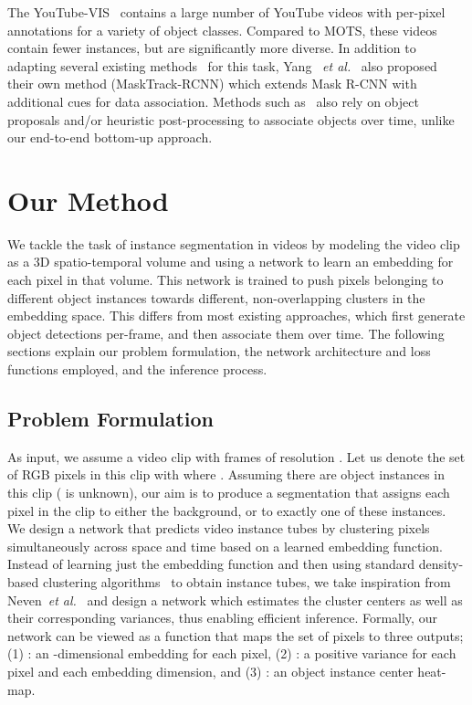 \documentclass[runningheads]{llncs}
\makeatletter
\newcommand*{\etal}{\emph{et al.}\@\xspace}
\makeatother
\begin{document}
The YouTube-VIS~\cite{Yang19ICCV} contains a large number of YouTube videos with per-pixel annotations for a variety of object classes. Compared to MOTS, these videos contain fewer instances, but are significantly more diverse. 
In addition to adapting several existing methods~\cite{Bochinski17AVSS,Han16arxiv,Voigtlaender19CVPRFeelVOS,Wojke17ICIP,Yang18CVPR} for this task, Yang ~\etal~\cite{Yang19ICCV} also proposed their own method (MaskTrack-RCNN) which extends Mask R-CNN with additional cues for data association. 
Methods such as~\cite{Dong19ICCVW,Feng19ICCVW,Liu19ICCVW} also rely on object proposals and/or heuristic post-processing to associate objects over time, unlike our end-to-end bottom-up approach. 
\section{Our Method}

We tackle the task of instance segmentation in videos by modeling the video clip as a 3D spatio-temporal volume and using a network to learn an embedding for each pixel in that volume. This network is trained to push pixels belonging to different object instances towards different, non-overlapping clusters in the embedding space. 
This differs from most existing approaches, which first generate object detections per-frame, and then associate them over time. The following sections explain our problem formulation, the network architecture and loss functions employed, and the inference process.

\subsection{Problem Formulation}
\label{sec:problem_formulation}

As input, we assume a video clip with  frames of resolution . Let us denote the set of RGB pixels in this clip with  where . 
Assuming there are  object instances in this clip ( is unknown), our aim is to produce a segmentation that assigns each pixel in the clip to either the background, or to exactly one of these  instances.
We design a network that predicts video instance tubes by clustering pixels simultaneously across space and time based on a learned embedding function. 
Instead of learning just the embedding function and then using standard density-based clustering algorithms~\cite{Fukunaga1975TOIT,Lloyd1982TOIT,Mcinnes2017OSS} to obtain instance tubes, we take inspiration from Neven~\etal~\cite{Neven19CVPR} and design a network which estimates the cluster centers as well as their corresponding variances, thus enabling efficient inference.
Formally, our network can be viewed as a function that maps the set of pixels  to three outputs; (1) : an -dimensional embedding for each pixel, (2) : a positive variance for each pixel and each embedding dimension, and (3) : an object instance center heat-map.
\end{document}
